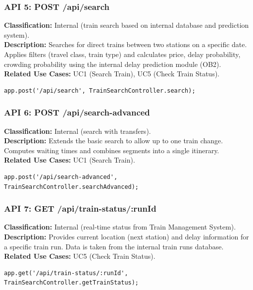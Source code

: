 \documentclass{article}
\begin{document}
\subsubsection*{API 5: POST /api/search}
\textbf{Classification:} Internal (train search based on internal database and prediction system).\\
\textbf{Description:} Searches for direct trains between two stations on a specific date.
Applies filters (travel class, train type) and calculates price, delay probability,
crowding probability using the internal delay prediction module (OB2).\\
\textbf{Related Use Cases:} UC1 (Search Train), UC5 (Check Train Status).
\begin{verbatim}
app.post('/api/search', TrainSearchController.search);
\end{verbatim}

\subsubsection*{API 6: POST /api/search-advanced}
\textbf{Classification:} Internal (search with transfers).\\
\textbf{Description:} Extends the basic search to allow up to one train change.
Computes waiting times and combines segments into a single itinerary.\\
\textbf{Related Use Cases:} UC1 (Search Train).
\begin{verbatim}
app.post('/api/search-advanced', TrainSearchController.searchAdvanced);
\end{verbatim}

\subsubsection*{API 7: GET /api/train-status/:runId}
\textbf{Classification:} Internal (real‑time status from Train Management System).\\
\textbf{Description:} Provides current location (next station) and delay information
for a specific train run. Data is taken from the internal train runs database.\\
\textbf{Related Use Cases:} UC5 (Check Train Status).
\begin{verbatim}
app.get('/api/train-status/:runId', TrainSearchController.getTrainStatus);
\end{verbatim}
\end{document}
